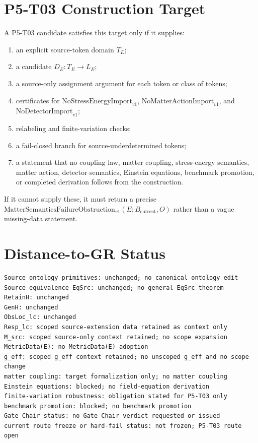 \documentclass[11pt]{article}
\newcommand{\Bcur}{B_{\mathrm{current}}}
\newcommand{\NoSE}{\mathrm{NoStressEnergyImport}_{v1}}
\newcommand{\NoAction}{\mathrm{NoMatterActionImport}_{v1}}
\newcommand{\NoDetector}{\mathrm{NoDetectorImport}_{v1}}
\newcommand{\FailureObs}{\mathrm{MatterSemanticsFailureObstruction}_{v1}}
\begin{document}
\section{P5-T03 Construction Target}

A P5-T03 candidate satisfies this target only if it supplies:
\begin{enumerate}[leftmargin=*]
\item an explicit source-token domain \(T_E\);
\item a candidate \(D_E:T_E\to L_E\);
\item a source-only assignment argument for each token or class of tokens;
\item certificates for \(\NoSE\), \(\NoAction\), and \(\NoDetector\);
\item relabeling and finite-variation checks;
\item a fail-closed branch for source-underdetermined tokens;
\item a statement that no coupling law, matter coupling, stress-energy
  semantics, matter action, detector semantics, Einstein equations, benchmark
  promotion, or completed derivation follows from the construction.
\end{enumerate}

If it cannot supply these, it must return a precise
\(\FailureObs(E;\Bcur,O)\) rather than a vague missing-data statement.

\section{Distance-to-GR Status}

\begin{verbatim}
Source ontology primitives: unchanged; no canonical ontology edit
Source equivalence EqSrc: unchanged; no general EqSrc theorem
RetainH: unchanged
GenH: unchanged
ObsLoc_lc: unchanged
Resp_lc: scoped source-extension data retained as context only
M_src: scoped source-only context retained; no scope expansion
MetricData(E): no MetricData(E) adoption
g_eff: scoped g_eff context retained; no unscoped g_eff and no scope change
matter coupling: target formalization only; no matter coupling
Einstein equations: blocked; no field-equation derivation
finite-variation robustness: obligation stated for P5-T03 only
benchmark promotion: blocked; no benchmark promotion
Gate Chair status: no Gate Chair verdict requested or issued
current route freeze or hard-fail status: not frozen; P5-T03 route open
\end{verbatim}
\end{document}
